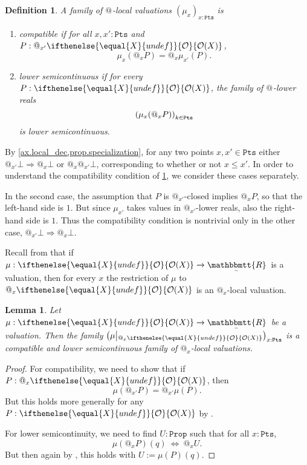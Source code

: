 \documentclass[reqno,11pt]{amsproc}
\makeatletter
\theoremstyle{plain}
\newtheorem{lemma}[theorem]{Lemma}
\newtheorem{definition}[theorem]{Definition}
\theoremstyle{definition}
\newcommand{\Const}[1]{\mathtt{#1}}
\renewcommand{\to}[1][]{\xrightarrow{#1}}
\newcommand{\ubar}[1]{\underaccent{\bar}{#1}}
\newcommand{\internal}[1]{\raisebox{-.03ex}{$\mathbbmtt{#1}$}}
\newcommand{\hs}{\hspace{1pt}}
\newcommand{\trr}{\internal{R}}
\newcommand{\tlrr}{\ubar{\trr}\hs}
\newcommand{\prop}{\Const{Prop}}
\newcommand{\pt}{x}
\newcommand{\Op}[1][undef]{\ifthenelse{\equal{#1}{undef}}{\mathcal{O}}{\mathcal{O}(#1)}}
\newcommand{\pts}{\mathtt{Pts}}		%
\newcommand{\rest}[2]{#1\big|\hspace{0in}_{#2}}
\newcommand{\atsymbol}{{@}}
\newcommand{\at}[1][\pt]{\atsymbol_{#1}}
\newcommand{\imp}{\Rightarrow}
\newcommand{\false}{\bot}
\let\originalleft\left
\let\originalright\right
\renewcommand{\left}{\mathopen{}\mathclose\bgroup\originalleft}
\renewcommand{\right}{\aftergroup\egroup\originalright}
\numberwithin{equation}{section}
\makeatother
\begin{document}
\begin{definition}\label{def.valuations_compatible_lowersemi}
	A family of $\at[]$-local valuations $(\mu_\pt)_{\pt : \pts}$ is
	\begin{enumerate}
		\item \emph{compatible} if for all $\pt, \pt' : \pts$ and $P : \at[\pt'] \Op[X]$,
			\[
				\mu_{\pt}(\at[\pt] P) = \at[\pt] \mu_{\pt'}(P).
			\]
		\item \emph{lower semicontinuous} if for every $P : \Op[X]$, the family of $\at[]$-lower reals
			\[
				\left( \mu_\pt(\at P) \right)_{k\in\pts}
			\]
			is lower semicontinuous.
	\end{enumerate}
\end{definition}

By \cref{ax.local_dec,prop.specialization}, for any two points $\pt,\pt'\in\pts$ either $\at[\pt']\false\imp\at[\pt]\false$ or $\at[\pt]\at[\pt']\false$, corresponding to whether or not $\pt\leq\pt'$. In order to understand the compatibility condition of \cref{def.valuations_compatible_lowersemi}, we consider these cases separately. 

In the second case, the assumption that $P$ is $\at[\pt']$-closed implies $\at[\pt] P$, so that the left-hand side is $1$. But since $\mu_{\pt'}$ takes values in $\at[\pt']$-lower reals, also the right-hand side is $1$. Thus the compatibility condition is nontrivial only in the other case, $\at[\pt'] \bot \imp \at[\pt] \bot$.

Recall from  that if $\mu : \Op[X] \to \tlrr$ is a valuation, then for every $\pt$ the restriction of $\mu$ to $\at \Op[X]$ is an $\at$-local valuation. 

\begin{lemma}\label{lemma.val_rests_compat_lowersemi}
	Let $\mu : \Op[X] \to \tlrr$ be a valuation. Then the family $\left( \rest{\mu}{\at \Op[X]} \right)_{\pt : \pts}$ is a compatible and lower semicontinuous family of $\at$-local valuations.
\end{lemma}

\begin{proof}
	For compatibility, we need to show that if $P : \at \Op[X]$, then
	\[
		\mu( \at[\pt'] P ) = \at[\pt'] \mu(P).
	\]
	But this holds more generally for any $P:\Op[X]$ by .

	For lower semicontinuity, we need to find $U : \prop$ such that for all $\pt : \pts$,
	\[
		\mu(\at P)(q) \: \Leftrightarrow \: \at U.
	\]
	But then again by , this holds with $U := \mu(P)(q)$.
\end{proof}
\end{document}
